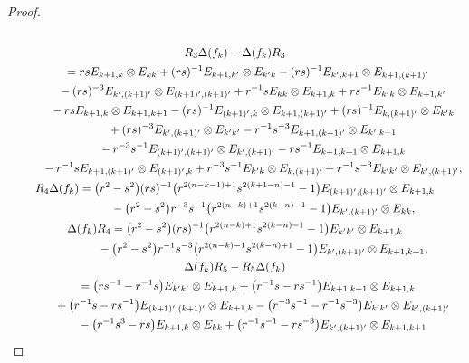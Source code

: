 \documentclass[10pt,a4paper]{amsart}
\numberwithin{equation}{section}
\begin{document}
\begin{proof}
\begin{gather*}
\\[0.2mm]
 R_{3}\Delta(f_{k}) - \Delta(f_{k})R_{3} \\[0.2mm]
 \qquad{}= rsE_{k + 1,k} \otimes E_{kk} + (rs)^{-1}E_{k + 1,k'} \otimes E_{k'k} - (rs)^{-1}E_{k',k + 1} \otimes E_{k + 1,(k + 1)'} \\[0.2mm]
 \quad\qquad{} - (rs)^{-3}E_{k',(k + 1)'} \otimes E_{(k + 1)',(k + 1)'} + r^{-1}sE_{kk} \otimes E_{k + 1,k} + rs^{-1}E_{k'k} \otimes E_{k + 1,k'} \\[0.2mm]
 \quad\qquad{} - rsE_{k + 1,k} \otimes E_{k + 1,k+1} - (rs)^{-1}E_{(k + 1)',k} \otimes E_{k + 1,(k + 1)'} + (rs)^{-1}E_{k,(k + 1)'} \otimes E_{k'k} \\[0.2mm]
 \quad\qquad{} + (rs)^{-3}E_{k',(k + 1)'} \otimes E_{k'k'} - r^{-1}s^{-3}E_{k + 1,(k + 1)'} \otimes E_{k',k + 1} \\[0.2mm]
 \quad\qquad{} - r^{-3}s^{-1}E_{(k + 1)',(k + 1)'} \otimes E_{k',(k + 1)'}- rs^{-1}E_{k + 1,k+1} \otimes E_{k + 1,k} \\[0.2mm]
 \quad\qquad{} - r^{-1}sE_{k + 1,(k + 1)'} \otimes E_{(k + 1)',k} + r^{-3}s^{-1}E_{k'k} \otimes E_{k,(k +1)'}+ r^{-1}s^{-3}E_{k'k'} \otimes E_{k',(k + 1)'},
\\[0.2mm]
 R_{4}\Delta(f_{k}) = \bigl(r^{2} - s^{2} \bigr)(rs)^{-1} \bigl(r^{2(n - k - 1) + 1}s^{2(k + 1 - n) - 1} - 1 \bigr)E_{(k + 1)',(k + 1)'} \otimes E_{k + 1,k} \\[0.2mm]
 \hphantom{R_{4}\Delta(f_{k}) =}{}
 - \bigl(r^{2} - s^{2} \bigr)r^{-3}s^{-1} \bigl(r^{2(n - k) + 1}s^{2(k - n) - 1} - 1 \bigr)E_{k',(k + 1)'} \otimes E_{kk},
 \\[0.2mm]
 \Delta(f_{k})R_{4} = \bigl(r^{2} - s^{2} \bigr)(rs)^{-1} \bigl(r^{2(n - k) + 1}s^{2(k - n) - 1} - 1 \bigr)E_{k'k'} \otimes E_{k + 1,k} \\[0.2mm]
 \hphantom{\Delta(f_{k})R_{4} = }{}
 - \bigl(r^{2} - s^{2} \bigr)r^{-1}s^{-3} \bigl(r^{2(n - k) - 1}s^{2(k - n) + 1} - 1 \bigr)E_{k',(k + 1)'} \otimes E_{k + 1,k+1},
\\[0.2mm]
 \Delta(f_{k})R_{5} - R_{5}\Delta(f_{k}) \\[0.2mm]
 \qquad{}= \bigl(rs^{-1} - r^{-1}s \bigr)E_{k'k'} \otimes E_{k + 1,k} + \bigl(r^{-1}s - rs^{-1} \bigr)E_{k + 1,k + 1} \otimes E_{k + 1,k} \\[0.2mm]
 \quad\qquad{} + \bigl(r^{-1}s - rs^{-1} \bigr)E_{(k + 1)',(k + 1)'} \otimes E_{k + 1,k} - \bigl(r^{-3}s^{-1} - r^{-1}s^{-3} \bigr)E_{k'k'} \otimes E_{k',(k + 1)'} \\[0.2mm]
 \quad\qquad{} - \bigl(r^{-1}s^{3} - rs \bigr)E_{k + 1,k} \otimes E_{kk} + \bigl(r^{-1}s^{-1} - rs^{-3} \bigr)E_{k',(k + 1)'} \otimes E_{k + 1,k + 1} \\[0.2mm]

\end{gather*}
\end{proof}
\end{document}
